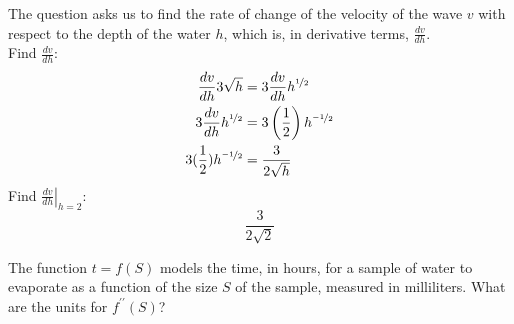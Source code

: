 \documentclass[12pt,letterpaper, onecolumn]{exam}
\newcommand\at[2]{\left.#1\right|_{#2}}
\begin{document}
\begin{questions}

	\begin{solution}
		The  question asks us to find the rate of change of the velocity of the wave $v$ with respect to the depth of the water $h$, which is, in derivative terms, $\frac{dv}{dh}$. \\
		Find $\frac{dv}{dh}$:
		\begin{align*}
			\frac{dv}{dh} 3\sqrt{h} & = 3 \frac{dv}{dh} h^{\nicefrac{1}{2}} \\
			3 \frac{dv}{dh} h^{\nicefrac{1}{2}} & = 3 \left(\frac{1}{2}\right) h^{\nicefrac{-1}{2}} \\
			3 (\frac{1}{2}) h^{\nicefrac{-1}{2}} & = \frac{3}{2\sqrt{h}}
		\end{align*}
		Find $\at{\frac{dv}{dh}}{h=2}$:
			$$\boxed{\frac{3}{2\sqrt{2}}}$$
	\end{solution}

\pagebreak

\question The function $t=f(S)$ models the time, in hours, for a sample of water to evaporate as a function of the size $S$ of the sample, measured in milliliters. What are the units for $f^{\prime\prime}(S)$?
\end{questions}
\end{document}
